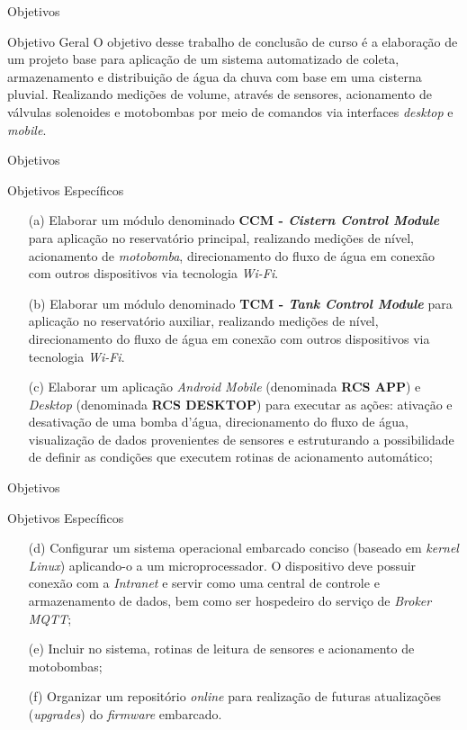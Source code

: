 \begin{frame}{Objetivos}
\begin{block}{Objetivo Geral}
    O objetivo desse trabalho de conclusão de curso é a elaboração de um projeto base para aplicação de um sistema automatizado de coleta, armazenamento e distribuição de água da chuva com base em uma cisterna pluvial. Realizando medições de volume, através de sensores, acionamento de válvulas solenoides e motobombas por meio de comandos via interfaces \textit{desktop} e \textit{mobile}.
\end{block}
\end{frame}

\begin{frame}{Objetivos}
\begin{block}{Objetivos Específicos}
\begin{itemize}
    \item [(a)] Elaborar um módulo denominado \textbf{CCM - \textit{Cistern Control Module}} para aplicação no reservatório principal, realizando medições de nível, acionamento de \textit{motobomba}, direcionamento do fluxo de água em conexão com outros dispositivos via tecnologia \textit{Wi-Fi}.
	\item [(b)] Elaborar um módulo denominado \textbf{TCM - \textit{Tank Control Module}} para aplicação no reservatório auxiliar, realizando medições de nível, direcionamento do fluxo de água em conexão com outros dispositivos via tecnologia \textit{Wi-Fi}.
	\item [(c)] Elaborar um aplicação \textit{Android Mobile} (denominada \textbf{RCS APP}) e \textit{Desktop} (denominada \textbf{RCS DESKTOP}) para executar as ações: ativação e desativação de uma bomba d'água, direcionamento do fluxo de água, visualização de dados provenientes de sensores e estruturando a possibilidade de definir as condições que executem rotinas de acionamento automático;
\end{itemize}
\end{block}
\end{frame}

\begin{frame}{Objetivos}
    \begin{block}{Objetivos Específicos}
    \begin{itemize}
        \item [(d)] Configurar um sistema operacional embarcado conciso (baseado em \textit{kernel Linux}) aplicando-o a um microprocessador. O dispositivo deve possuir conexão com a \textit{Intranet} e servir como uma central de controle e armazenamento de dados, bem como ser hospedeiro do serviço de \textit{Broker MQTT};
        \item [(e)] Incluir no sistema, rotinas de leitura de sensores e acionamento de motobombas;
        \item [(f)] Organizar um repositório \textit{online} para realização de futuras atualizações (\textit{upgrades}) do \textit{firmware} embarcado.
    \end{itemize}
    \end{block}
\end{frame}
